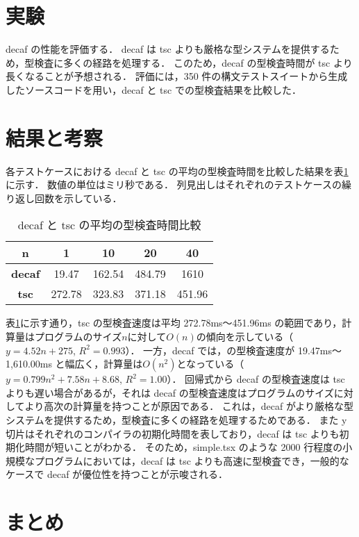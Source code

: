 \documentclass[11pt,twocolumn]{classes/yokou}
\begin{document}
\section{実験}

decaf の性能を評価する．
decaf は tsc よりも厳格な型システムを提供するため，型検査に多くの経路を処理する．
このため，decaf の型検査時間が tsc より長くなることが予想される．
評価には，350 件の構文テストスイートから生成したソースコードを用い，decaf と tsc での型検査結果を比較した．

\section{結果と考察}

各テストケースにおける decaf と tsc の平均の型検査時間を比較した結果を表\ref{tab:comparison} に示す．
数値の単位はミリ秒である．
列見出しはそれぞれのテストケースの繰り返し回数を示している．

\begin{table}[h]
	\caption{decaf と tsc の平均の型検査時間比較}
	\begin{tabular}{|c|c|c|c|c|}
		\hline
		\textbf{n}     & 1      & 10     & 20     & 40     \\ \hline
		\textbf{decaf} & 19.47  & 162.54 & 484.79 & 1610   \\ \hline
		\textbf{tsc}   & 272.78 & 323.83 & 371.18 & 451.96 \\ \hline
	\end{tabular}
	\label{tab:comparison}
\end{table}

表\ref{tab:comparison}に示す通り，tsc の型検査速度は平均 272.78ms〜451.96ms の範囲であり，計算量はプログラムのサイズ$n$に対して$O(n)$の傾向を示している（$y = 4.52n + 275$, $R^2 = 0.993$）．
一方，decaf では，の型検査速度が 19.47ms〜1,610.00ms と幅広く，計算量は$O(n^2)$となっている（$y = 0.799n^2 + 7.58n + 8.68$, $R^2 = 1.00$）．
回帰式から decaf の型検査速度は tsc よりも遅い場合があるが，それは decaf の型検査速度はプログラムのサイズに対してより高次の計算量を持つことが原因である．
これは，decaf がより厳格な型システムを提供するため，型検査に多くの経路を処理するためである．
また y 切片はそれぞれのコンパイラの初期化時間を表しており，decaf は tsc よりも初期化時間が短いことがわかる．
そのため，simple.tsx のような 2000 行程度の小規模なプログラムにおいては，decaf は tsc よりも高速に型検査でき，一般的なケースで decaf が優位性を持つことが示唆される．

\section{まとめ}
\end{document}
